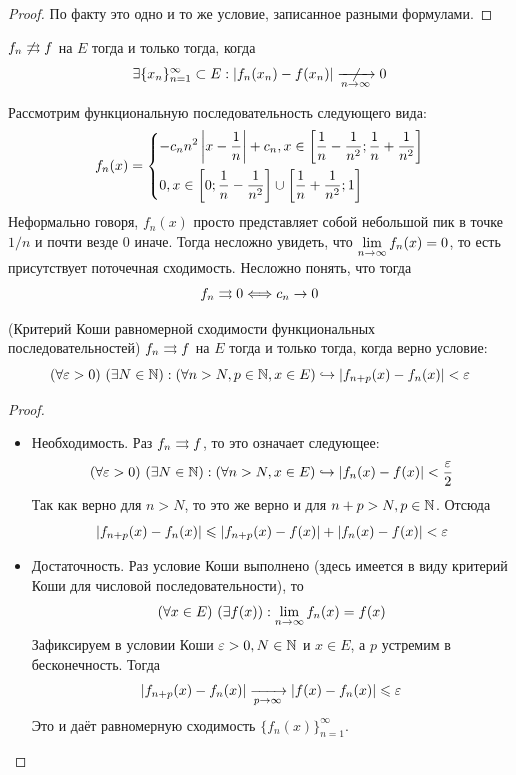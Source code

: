 \begin{proof}
	По факту это одно и то же условие, записанное разными формулами.
\end{proof}

\begin{corollary}
	$f_n \not\rightrightarrows f$ на $E$ тогда и только тогда, когда
	\[
		\exists \{x_n\}_{n = 1}^\infty \subset E : |f_n(x_n) - f(x_n)| \centernot{\xrightarrow[n \to \infty]{}} 0
	\]
\end{corollary}

\begin{example}
	Рассмотрим функциональную последовательность следующего вида:
	\[
		f_n(x) = \left\{\begin{aligned}
			&{-c_n n^2 \left|x - \frac{1}{n}\right| + c_n, x \in \left[\frac{1}{n} - \frac{1}{n^2}; \frac{1}{n} + \frac{1}{n^2}\right]}
			\\
			&{0, x \in \left[0; \frac{1}{n} - \frac{1}{n^2}\right] \cup \left[\frac{1}{n} + \frac{1}{n^2}; 1\right]}
		\end{aligned}\right.
	\]
	Неформально говоря, $f_n(x)$ просто представляет собой небольшой пик в точке $1/n$ и почти везде 0 иначе. Тогда несложно увидеть, что $\lim\limits_{n \to \infty} f_n(x) = 0$, то есть присутствует поточечная сходимость. Несложно понять, что тогда
	\[
		f_n \rightrightarrows 0 \Longleftrightarrow c_n \to 0
	\]
\end{example}

\begin{theorem} (Критерий Коши равномерной сходимости функциональных последовательностей)
	$f_n \rightrightarrows f$ на $E$ тогда и только тогда, когда верно условие:
	\[
		(\forall \varepsilon > 0)\ (\exists N \in \mathbb{N}) : (\forall n > N, p \in \mathbb{N}, x \in E) \hookrightarrow |f_{n + p}(x) - f_n(x)| < \varepsilon
	\]
\end{theorem}

\begin{proof}~
	\begin{itemize}
		\item Необходимость. Раз $f_n \rightrightarrows f$, то это означает следующее:
		\[
			(\forall \varepsilon > 0)\ (\exists N \in \mathbb{N}) : (\forall n > N, x \in E) \hookrightarrow |f_n(x) - f(x)| < \frac{\varepsilon}{2}
		\]
		Так как верно для $n > N$, то это же верно и для $n + p > N, p \in \mathbb{N}$. Отсюда
		\[
			|f_{n + p}(x) - f_n(x)| \leqslant |f_{n + p}(x) - f(x)| + |f_n(x) - f(x)| < \varepsilon
		\]
		
		\item Достаточность. Раз условие Коши выполнено (здесь имеется в виду критерий Коши для числовой последовательности), то
		\[
			(\forall x \in E)\ (\exists f(x)) : \lim\limits_{n \to \infty} f_n(x) = f(x)
		\]
		Зафиксируем в условии Коши $\varepsilon > 0, N \in \mathbb{N}$ и $x \in E$, а $p$ устремим в бесконечность. Тогда
		\[
			|f_{n + p}(x) - f_n(x)| \xrightarrow[p \to \infty]{} |f(x) - f_n(x)| \leqslant \varepsilon
		\]
		Это и даёт равномерную сходимость $\{f_n(x)\}_{n = 1}^\infty$.
	\end{itemize}
\end{proof}

